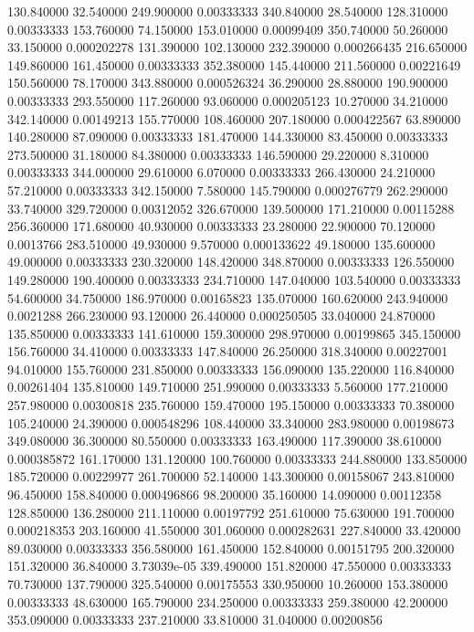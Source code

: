 130.840000	32.540000	249.900000	0.00333333
340.840000	28.540000	128.310000	0.00333333
153.760000	74.150000	153.010000	0.00099409
350.740000	50.260000	33.150000	0.000202278
131.390000	102.130000	232.390000	0.000266435
216.650000	149.860000	161.450000	0.00333333
352.380000	145.440000	211.560000	0.00221649
150.560000	78.170000	343.880000	0.000526324
36.290000	28.880000	190.900000	0.00333333
293.550000	117.260000	93.060000	0.000205123
10.270000	34.210000	342.140000	0.00149213
155.770000	108.460000	207.180000	0.000422567
63.890000	140.280000	87.090000	0.00333333
181.470000	144.330000	83.450000	0.00333333
273.500000	31.180000	84.380000	0.00333333
146.590000	29.220000	8.310000	0.00333333
344.000000	29.610000	6.070000	0.00333333
266.430000	24.210000	57.210000	0.00333333
342.150000	7.580000	145.790000	0.000276779
262.290000	33.740000	329.720000	0.00312052
326.670000	139.500000	171.210000	0.00115288
256.360000	171.680000	40.930000	0.00333333
23.280000	22.900000	70.120000	0.0013766
283.510000	49.930000	9.570000	0.000133622
49.180000	135.600000	49.000000	0.00333333
230.320000	148.420000	348.870000	0.00333333
126.550000	149.280000	190.400000	0.00333333
234.710000	147.040000	103.540000	0.00333333
54.600000	34.750000	186.970000	0.00165823
135.070000	160.620000	243.940000	0.0021288
266.230000	93.120000	26.440000	0.000250505
33.040000	24.870000	135.850000	0.00333333
141.610000	159.300000	298.970000	0.00199865
345.150000	156.760000	34.410000	0.00333333
147.840000	26.250000	318.340000	0.00227001
94.010000	155.760000	231.850000	0.00333333
156.090000	135.220000	116.840000	0.00261404
135.810000	149.710000	251.990000	0.00333333
5.560000	177.210000	257.980000	0.00300818
235.760000	159.470000	195.150000	0.00333333
70.380000	105.240000	24.390000	0.000548296
108.440000	33.340000	283.980000	0.00198673
349.080000	36.300000	80.550000	0.00333333
163.490000	117.390000	38.610000	0.000385872
161.170000	131.120000	100.760000	0.00333333
244.880000	133.850000	185.720000	0.00229977
261.700000	52.140000	143.300000	0.00158067
243.810000	96.450000	158.840000	0.000496866
98.200000	35.160000	14.090000	0.00112358
128.850000	136.280000	211.110000	0.00197792
251.610000	75.630000	191.700000	0.000218353
203.160000	41.550000	301.060000	0.000282631
227.840000	33.420000	89.030000	0.00333333
356.580000	161.450000	152.840000	0.00151795
200.320000	151.320000	36.840000	3.73039e-05
339.490000	151.820000	47.550000	0.00333333
70.730000	137.790000	325.540000	0.00175553
330.950000	10.260000	153.380000	0.00333333
48.630000	165.790000	234.250000	0.00333333
259.380000	42.200000	353.090000	0.00333333
237.210000	33.810000	31.040000	0.00200856
